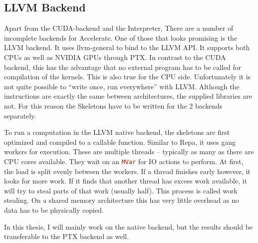 \documentclass[a4paper,bibliography=totocnumbered,parskip,headsepline]{scrbook}
\begin{document}
\subsection{LLVM Backend}
Apart from the CUDA-backend and the Interpreter, There are a number of incomplete backends for Accelerate.
One of those that looks promising is the LLVM backend.\cite{trevor2014llvm}
It uses llvm-general to bind to the LLVM API.
It supports both CPUs as well as NVIDIA GPUs through PTX.
In contrast to the CUDA backend, this has the advantage that no external program has to be called for compilation of the kernels.
This is also true for the CPU side.
Unfortunately it is not quite possible to ``write once, run everywhere'' with LLVM.
Although the instructions are exactly the same between architectures, the supplied libraries are not.
For this reason the Skeletons have to be written for the 2 backends separately.

To run a computation in the LLVM native backend, the skeletons are first optimized and compiled to a callable function.
Similar to Repa, it uses gang workers\cite{chakravarty2007data} for execution.
These are multiple threads -- typically as many as there are CPU cores available.
They wait on an \lstinline[language=haskell]!MVar! for IO actions to perform.
At first, the load is split evenly between the workers.
If a thread finishes early however, it looks for more work.
If it finds that another thread has excess work available, it will try to steal parts of that work (usually half).
This process is called work stealing.
On a shared memory architecture this has very little overhead as no data has to be physically copied.

In this thesis, I will mainly work on the native backend, but the results should be transferable to the PTX backend as well.
\end{document}
